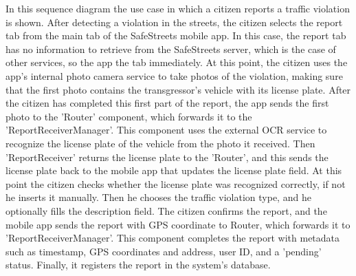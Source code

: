 In this sequence diagram the use case in which a citizen reports a traffic violation is shown. After detecting a violation in the streets, the citizen selects the report tab from the main tab of the SafeStreets mobile app. In this case, the report tab has no information to retrieve from the SafeStreets server, which is the case of other services, so the app the tab immediately. At this point, the citizen uses the app's internal photo camera service to take photos of the violation, making sure that the first photo contains the transgressor's vehicle with its license plate. After the citizen has completed this first part of the report, the app sends the first photo to the 'Router' component, which forwards it to the 'ReportReceiverManager'. This component uses the external OCR service to recognize the license plate of the vehicle from the photo it received. Then 'ReportReceiver' returns the license plate to the 'Router', and this sends the license plate back to the mobile app that updates the license plate field. At this point the citizen checks whether the license plate was recognized correctly, if not he inserts it manually. Then he chooses the traffic violation type, and he optionally fills the description field. The citizen confirms the report, and the mobile app sends the report with GPS coordinate to Router, which forwards it to 'ReportReceiverManager'. This component completes the report with metadata such as timestamp, GPS coordinates and address, user ID, and a 'pending' status. Finally, it registers the report in the system's database.

